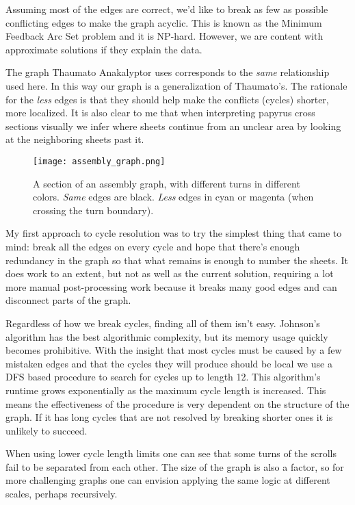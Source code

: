 \documentclass{article}
\begin{document}
Assuming most of the edges are correct, we'd like to break as few as possible conflicting edges to make the graph acyclic. This is known as the Minimum Feedback Arc Set problem and it is NP-hard. However, we are content with approximate solutions if they explain the data.

The graph Thaumato Anakalyptor uses corresponds to the \emph{same} relationship used here. In this way our graph is a generalization of Thaumato's. The rationale for the \emph{less} edges is that they should help make the conflicts (cycles) shorter, more localized. It is also clear to me that when interpreting papyrus cross sections visually we infer where sheets continue from an unclear area by looking at the neighboring sheets past it.

\begin{figure}
    \centering
    \texttt{[image: assembly\_graph.png]}
    \caption{A section of an assembly graph, with different turns in different colors. \emph{Same} edges are black. \emph{Less} edges in cyan or magenta (when crossing the turn boundary).}
    \label{assembly-graph}
\end{figure}

My first approach to cycle resolution was to try the simplest thing that came to mind: break all the edges on every cycle and hope that there's enough redundancy in the graph so that what remains is enough to number the sheets. It does work to an extent, but not as well as the current solution, requiring a lot more manual post-processing work because it breaks many good edges and can disconnect parts of the graph.

Regardless of how we break cycles, finding all of them isn't easy. Johnson's algorithm has the best algorithmic complexity, but its memory usage quickly becomes prohibitive. With the insight that most cycles must be caused by a few mistaken edges and that the cycles they will produce should be local we use a DFS based procedure to search for cycles up to length 12. This algorithm's runtime grows exponentially as the maximum cycle length is increased. This means the effectiveness of the procedure is very dependent on the structure of the graph. If it has long cycles that are not resolved by breaking shorter ones it is unlikely to succeed.

When using lower cycle length limits one can see that some turns of the scrolls fail to be separated from each other. The size of the graph is also a factor, so for more challenging graphs one can envision applying the same logic at different scales, perhaps recursively.
\end{document}
